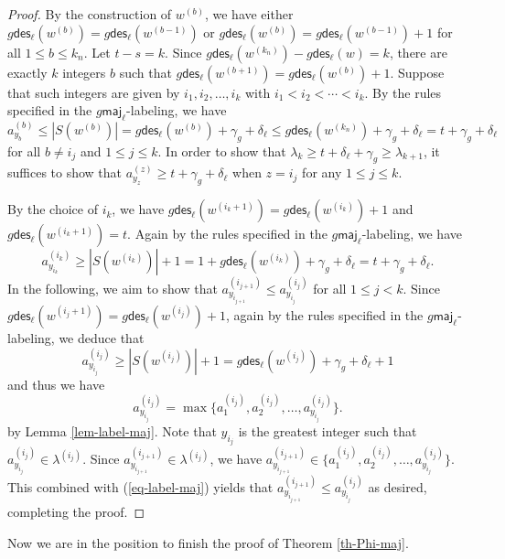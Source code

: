 \documentclass[12pt]{article}
\numberwithin{equation}{section}
\theoremstyle{plain}
\def\des{\mathsf{des}}
\def\maj{\mathsf{maj}}
\begin{document}
  \begin{proof}
  By the construction of $w^{(b)}$,  we     have either  $g\des_\ell(w^{(b)})=g\des_\ell(w^{(b-1)})$ or $g\des_\ell(w^{(b)})=g\des_\ell(w^{(b-1)})+1$ for all $1\leq b\leq k_n$.  
  	Let $t-s=k$. 
  	Since $g\des_\ell(w^{(k_n)})-g\des_\ell(w)=k$,   there are exactly $k$  integers $b$ such that $g\des_\ell(w^{(b+1)})=g\des_\ell(w^{(b)})+1$.    
  	Suppose that such integers are given by  $i_1, i_2, \ldots, i_{k}$ with $i_1<i_2<\cdots<i_{k}$.  
  	By the rules specified in the $g\maj_\ell$-labeling, we have
  	$$a^{(b)}_{y_{b}}\leq |S(w^{(b)})|  =g\des_\ell(w^{(b)})+\gamma_g+\delta_\ell\leq g\des_\ell(w^{(k_n)})+\gamma_g+\delta_\ell=t+\gamma_g+\delta_\ell$$ for all 
  	$b\neq i_j $ and $1\leq j\leq k$.  In order to show that 	$\lambda_{k}\geq t+\delta_\ell+\gamma_g \geq \lambda_{k+1}$, it suffices to show that 	$a^{(z)}_{y_{z}}\geq t+\gamma_g+\delta_\ell $  when  $z=i_j$ for  any $1\leq j\leq k$. 
  	
  	
  	
  	
  	By the choice of $i_k$,  we have $g\des_\ell(w^{(i_k+1)})=g\des_\ell(w^{(i_k)})+1$  and $g\des_\ell(w^{(i_k+1)})=t$.  
  	Again by the rules specified in the $g\maj_\ell$-labeling,  we have
  	$$
  	a^{(i_{k})}_{y_{{i_{k}}}}\geq  |S(w^{(i_k)})|+1 = 1+g\des_\ell(w^{(i_{k})})+\gamma_g+\delta_\ell = t+\gamma_g+\delta_\ell. 
  	$$
  	In the following, we aim to show that
  	$a^{(i_{j+1})}_{y_{{i_{j+1}}}}\leq a^{(i_{j})}_{y_{{i_{j}}}}$ for all $1\leq j <k$. 
  	Since $g\des_\ell(w^{(i_{j}+1)})=g\des_\ell(w^{(i_j)})+1$, again by the rules specified in the $g\maj_\ell$-labeling, we deduce that  $$a^{(i_{j})}_{y_{{i_{j}}}}\geq |S(w^{(i_j)})|+1= g\des_\ell(w^{(i_{j})})+\gamma_g+\delta_\ell+1$$  and thus we have
  	\begin{equation}\label{eq-label-maj}
  		a^{(i_j)}_{y_{i_j}}=\max\{a^{(i_j)}_1,  a^{(i_j)}_2, \ldots, a^{(i_j)}_{y_{i_j}}\}. 
  	\end{equation}
  by Lemma \ref{lem-label-maj}. 
  	Note that $y_{i_j}$ is the greatest integer    such that $a^{(i_j)}_{y_{i_j}}\in \lambda^{(i_j)}$.  Since $a^{(i_{j+1})}_{y_{i_{j+1}}}\in \lambda^{(i_j)}$,   we have $a^{(i_{j+1})}_{y_{i_{j+1}}}\in \{a^{(i_j)}_1,  a^{(i_j)}_2, \ldots, a^{(i_j)}_{y_{i_j}}\}.$   This combined with (\ref{eq-label-maj}) yields that 
  	$a^{(i_{j+1})}_{y_{i_{j+1}}}\leq a^{(i_j)}_{y_{i_j}}$ as desired,  
  	completing the proof. 
  	
  \end{proof}
  
  Now we are in the position to finish the proof of Theorem   \ref{th-Phi-maj}.
  
\end{document}
